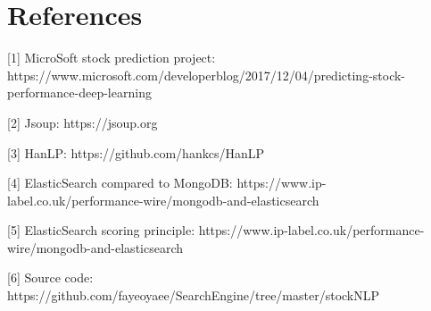 \documentclass{article}
\begin{document}
\section{References}
\vspace{-5pt}\hspace{-15pt}[1] MicroSoft stock prediction project: https://www.microsoft.com/developerblog/2017/12/04/predicting-stock-performance-deep-learning\par
\vspace{-5pt}\hspace{-15pt}[2] Jsoup: https://jsoup.org\par
\vspace{-5pt}\hspace{-15pt}[3] HanLP: https://github.com/hankcs/HanLP\par
\vspace{-5pt}\hspace{-15pt}[4] ElasticSearch compared to MongoDB: https://www.ip-label.co.uk/performance-wire/mongodb-and-elasticsearch\par
\vspace{-5pt}\hspace{-15pt}[5] ElasticSearch scoring principle: https://www.ip-label.co.uk/performance-wire/mongodb-and-elasticsearch\par
\vspace{-5pt}\hspace{-15pt}[6] Source code: https://github.com/fayeoyaee/SearchEngine/tree/master/stockNLP\par
\end{document}
